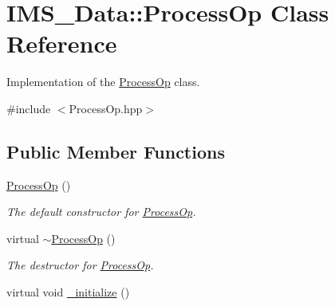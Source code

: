 \hypertarget{classIMS__Data_1_1ProcessOp}{
\section{IMS\_\-Data::ProcessOp Class Reference}
\label{classIMS__Data_1_1ProcessOp}
}


Implementation of the \hyperlink{classIMS__Data_1_1ProcessOp}{ProcessOp} class.  




{\ttfamily \#include $<$ProcessOp.hpp$>$}

\subsection*{Public Member Functions}
\begin{DoxyCompactItemize}
\item 
\hypertarget{classIMS__Data_1_1ProcessOp_af65f953cb8429f7689f73278fd98d7cf}{
\hyperlink{classIMS__Data_1_1ProcessOp_af65f953cb8429f7689f73278fd98d7cf}{ProcessOp} ()}
\label{classIMS__Data_1_1ProcessOp_af65f953cb8429f7689f73278fd98d7cf}

\begin{DoxyCompactList}\small\item\em The default constructor for \hyperlink{classIMS__Data_1_1ProcessOp}{ProcessOp}. \item\end{DoxyCompactList}\item 
\hypertarget{classIMS__Data_1_1ProcessOp_ad6712ebc5ccb40ea7418486dbe83d587}{
virtual \hyperlink{classIMS__Data_1_1ProcessOp_ad6712ebc5ccb40ea7418486dbe83d587}{$\sim$ProcessOp} ()}
\label{classIMS__Data_1_1ProcessOp_ad6712ebc5ccb40ea7418486dbe83d587}

\begin{DoxyCompactList}\small\item\em The destructor for \hyperlink{classIMS__Data_1_1ProcessOp}{ProcessOp}. \item\end{DoxyCompactList}\item 
\hypertarget{classIMS__Data_1_1ProcessOp_a2faed7da76a7dedd56eea6c5d9c788d6}{
virtual void \hyperlink{classIMS__Data_1_1ProcessOp_a2faed7da76a7dedd56eea6c5d9c788d6}{\_\-initialize} ()}
\label{classIMS__Data_1_1ProcessOp_a2faed7da76a7dedd56eea6c5d9c788d6}


\end{DoxyCompactItemize}
